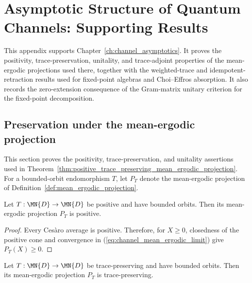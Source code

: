 \chapter{Asymptotic Structure of Quantum Channels: Supporting Results}
\label{ch:channel_asymptotics_supporting_results}

This appendix supports Chapter~\ref{ch:channel_asymptotics}. It proves the
positivity, trace-preservation, unitality, and trace-adjoint properties of the
mean-ergodic projections used there, together with the weighted-trace and
idempotent-retraction results used for fixed-point algebras and Choi--Effros
absorption. It also records the zero-extension consequence of the Gram-matrix
unitary criterion for the fixed-point decomposition.

\section{Preservation under the mean-ergodic projection}

This section proves the positivity, trace-preservation, and unitality assertions
used in Theorem~\ref{thm:positive_trace_preserving_mean_ergodic_projection}.
For a bounded-orbit endomorphism $T$, let $P_T$ denote the mean-ergodic
projection of Definition~\ref{def:mean_ergodic_projection}.

\begin{theorem}
    \label{thm:positive_mean_ergodic_projection}
    \leanok
    Let $T:\MN{D}\to\MN{D}$ be positive and have bounded orbits. Then its
    mean-ergodic projection $P_T$ is positive.
\end{theorem}

\begin{proof}\leanok
    Every Ces\`aro average is positive. Therefore, for $X\ge0$, closedness of
    the positive cone and convergence in
    (\ref{eq:channel_mean_ergodic_limit}) give $P_T(X)\ge0$.
\end{proof}

\begin{theorem}
    \label{thm:trace_preserving_mean_ergodic_projection}
    \leanok
    Let $T:\MN{D}\to\MN{D}$ be trace-preserving and have bounded orbits.
    Then its mean-ergodic projection $P_T$ is trace-preserving.
\end{theorem}


